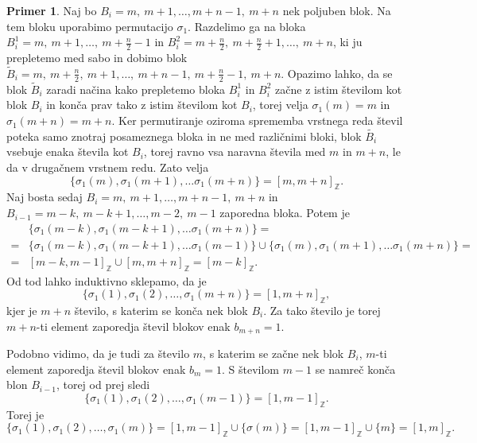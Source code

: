 \documentclass[12pt,a4paper,reqno]{amsart}
\theoremstyle{definition} %
\newtheorem{primer}[definicija]{Primer}
\theoremstyle{plain} %
\newcommand{\Z}{\mathbb Z}
\begin{document}
\begin{primer}
Naj bo $B_i = m,\ m+1, \dots, m+n-1,\ m+n$ nek poljuben blok. Na tem bloku uporabimo permutacijo $\sigma_1$. Razdelimo ga na bloka $B_i^1= m,\ m+1, \dots,\ m+\frac{n}{2}-1$ in $B_i^2= m+\frac{n}{2},\ m+\frac{n}{2}+1, \dots,\ m+n$, ki ju prepletemo med sabo in dobimo blok $\tilde{B}_i =  m,\ m+\frac{n}{2}, \ m+1, \dots,\ m+n-1, \ m+\frac{n}{2}-1,\ m+n$. Opazimo lahko, da se blok $\tilde{B}_i$ zaradi načina kako prepletemo bloka $B_i^1$ in $B_i^2$ začne z istim številom kot blok $B_i$ in konča prav tako z istim številom kot $B_i$, torej velja $\sigma_1(m)=m$ in $\sigma_1(m+n)=m+n$. Ker permutiranje oziroma sprememba vrstnega reda števil poteka samo znotraj posameznega bloka in ne med različnimi bloki, blok $\tilde{B_i}$ vsebuje enaka števila kot $B_i$, torej ravno vsa naravna števila med $m$ in $m+n$, le da v drugačnem vrstnem redu. Zato velja $$\{\sigma_1(m), \sigma_1(m+1), \ldots \sigma_1(m+n) \}=[m,m+n]_{\Z}.$$
Naj bosta sedaj $B_i = m,\ m+1, \dots, m+n-1,\ m+n$ in $B_{i-1} = m-k,\ m-k+1, \dots, m-2,\ m-1$ zaporedna bloka. Potem je 
\begin{align*}
&\{\sigma_1(m-k), \sigma_1(m-k+1), \ldots \sigma_1(m+n) \}=\\
=&\{\sigma_1(m-k), \sigma_1(m-k+1), \ldots \sigma_1(m-1) \} \cup \{\sigma_1(m), \sigma_1(m+1), \ldots \sigma_1(m+n) \}=\\
=&[m-k,m-1]_{\Z} \cup [m,m+n]_{\Z}=[m-k]_{\Z}.
\end{align*}
Od tod lahko induktivno sklepamo, da je $$\{ \sigma_1(1), \sigma_1(2), \ldots, \sigma_1(m+n) \}=[1,m+n]_{\Z},$$
kjer je $m+n$ število, s katerim se konča nek blok $B_i$. Za tako število je torej $m+n$-ti element zaporedja števil blokov enak $b_{m+n}=1$.

Podobno vidimo, da je tudi za število $m$, s katerim se začne nek blok $B_i$, $m$-ti element zaporedja števil blokov enak $b_m=1$. S številom $m-1$ se namreč konča blon $B_{i-1}$, torej od prej sledi $$\{ \sigma_1(1), \sigma_1(2), \ldots, \sigma_1(m-1) \}=[1,m-1]_{\Z}.$$
Torej je  $$\{ \sigma_1(1), \sigma_1(2), \ldots, \sigma_1(m) \}=[1,m-1]_{\Z} \cup \{\sigma(m)\}= [1,m-1]_{\Z} \cup \{m\}=[1,m]_{\Z}.$$


\end{primer}
\end{document}
